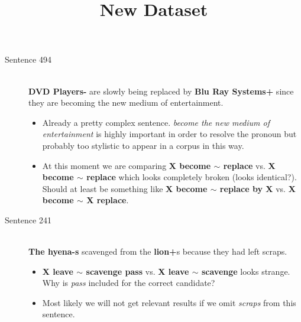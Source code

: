 \documentclass{scrartcl}
\begin{document}
\begin{description}
  \item[Sentence 494] \hfill \\
  {\bf DVD Players-} are slowly being replaced by {\bf Blu Ray Systems+} since they are becoming the new medium of entertainment.
  \begin{itemize}
  	\item Already a pretty complex sentence. {\it become the new medium of entertainment} is highly important in order to resolve the pronoun but probably too stylistic to appear in a corpus in this way.
  	\item At this moment we are comparing {\bf X become $\sim$ replace} vs. {\bf X become $\sim$ replace} which looks completely broken (looks identical?). Should at least be something like {\bf X become $\sim$ replace by X} vs. {\bf X become $\sim$ X replace}.
  \end{itemize}

  \item[Sentence 241] \hfill \\
  {\bf The hyena-s} scavenged from the {\bf lion+}s because they had left scraps.
  \begin{itemize}
  	\item {\bf X leave $\sim$ scavenge pass} vs. {\bf X leave $\sim$ scavenge} looks strange. Why is {\it pass} included for the correct candidate?
  	\item Most likely we will not get relevant results if we omit {\it scraps} from this sentence.
  \end{itemize}

\newpage
\begin{center}
	\title{{\large New Dataset}}
\end{center}


\end{description}

\end{document}
